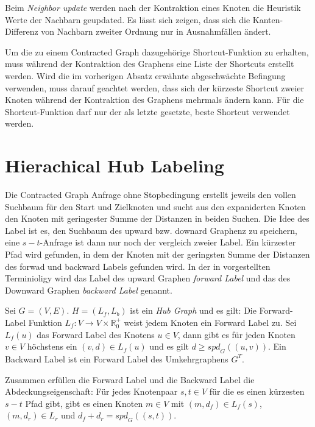Beim \emph{Neighbor update} werden nach der Kontraktion eines Knoten die Heuristik Werte der Nachbarn geupdated.
Es lässt sich zeigen, dass sich die Kanten-Differenz von Nachbarn zweiter Ordnung nur in Ausnahmfällen ändert.

Um die zu einem Contracted Graph dazugehörige Shortcut-Funktion zu erhalten, muss während der Kontraktion des Graphens eine Liste der Shortcuts erstellt werden.
Wird die im vorherigen Absatz erwähnte abgeschwächte Befingung verwenden, muss darauf geachtet werden, dass sich der kürzeste Shortcut zweier Knoten während der Kontraktion des Graphens mehrmals ändern kann.
Für die Shortcut-Funktion darf nur der als letzte gesetzte, beste Shortcut verwendet werden.

\section{Hierachical Hub Labeling}\label{chapter:hl}

Die Contracted Graph Anfrage ohne Stopbedingung erstellt jeweils den vollen Suchbaum für den Start und Zielknoten und sucht aus den expaniderten Knoten den Knoten mit geringester Summe der Distanzen in beiden Suchen.
Die Idee des Label ist es, den Suchbaum des upward bzw. downard Graphenz zu speichern, eine $s-t$-Anfrage ist dann nur noch der vergleich zweier Label.
Ein kürzester Pfad wird gefunden, in dem der Knoten mit der geringsten Summe der Distanzen des forwad und backward Labels gefunden wird.
In der in \cite{abraham2011hub} vorgestellten Terminioligy wird das Label des upward Graphen \emph{forward Label} und das des Downward Graphen \emph{backward Label} genannt.

\begin{definition}
    Sei $G = (V, E)$. $H = (L_f, L_b)$ ist ein \emph{Hub Graph} und es gilt:
    Die Forward-Label Funktion $L_f \colon V \to V \times \mathbb{R}^+_0$ weist jedem Knoten ein Forward Label zu.
    Sei $L_f (u)$ das Forward Label des Knotens $u \in V$, dann gibt es für jeden Knoten $v \in V$ höchstens ein $(v, d) \in L_f (u)$ und es gilt $d \geq {spd}_G((u, v))$.
    Ein Backward Label ist ein Forward Label des Umkehrgraphens $G^T$.

    Zusammen erfüllen die Forward Label und die Backward Label die Abdeckungseigenschaft:
    Für jedes Knotenpaar $s, t \in V$ für die es einen kürzesten $s-t$ Pfad gibt, gibt es einen Knoten $m \in V$ mit $(m, d_f) \in L_f (s)$, $(m, d_r) \in L_r$ und $d_f + d_r = {spd}_G ((s, t))$.
\end{definition}

